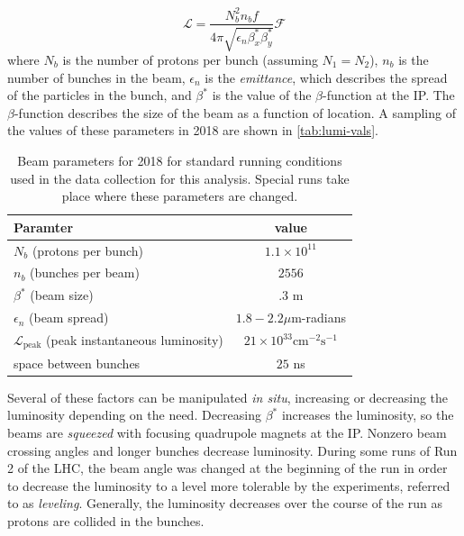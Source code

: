 \begin{equation}
\mathcal{L} = \frac{N_b^2 n_b f }{4\pi \sqrt{\epsilon_n \beta^*_x \beta^*_y}}\mathcal{F}
\end{equation}
where $N_b$ is the number of protons per bunch (assuming $N_1 = N_2$), $n_b$ is the number of bunches in the beam, $\epsilon_n$ is the \emph{emittance}, which describes the spread of the particles in the bunch, and $\beta^*$ is the value of the $\beta$-function at the \ac{IP}. The $\beta$-function describes the size of the beam as a function of location. A sampling of the values of these parameters in 2018 are shown in \autoref{tab:lumi-vals}.


\begin{table}
\centering
\begin{tabular}{lc}
\hline
Paramter & value  \\
\hline
$N_b$ (protons per bunch)                                           & $1.1 \times 10^{11}$   \\
$n_b$ (bunches per beam)                                            & $2556$   \\
$\beta^*$ (beam size)                                               & $.3$ m   \\
$\epsilon_n$ (beam spread)                                          & $1.8-2.2 \mu$m-radians   \\
$\mathcal{L}_{\textrm{peak}}$ (peak instantaneous luminosity)       & $21 \times 10^{33} \textrm{cm}^{-2}\textrm{s}^{-1}$   \\
space between bunches                                               & $25$ ns   \\
\hline
\end{tabular}
\caption{Beam parameters for 2018 for standard running conditions used in the data collection for this analysis. Special runs take place where these parameters are changed.}
\label{tab:lumi-vals}
\end{table}

Several of these factors can be manipulated \emph{in situ}, increasing or decreasing the luminosity depending on the need. Decreasing $\beta^*$ increases the luminosity, so the beams are \emph{squeezed} with focusing quadrupole magnets at the \ac{IP}. Nonzero beam crossing angles and longer bunches decrease luminosity. During some runs of Run 2 of the \ac{LHC}, the beam angle was changed at the beginning of the run in order to decrease the luminosity to a level more tolerable by the experiments, referred to as \emph{leveling}. Generally, the luminosity decreases over the course of the run as protons are collided in the bunches.


